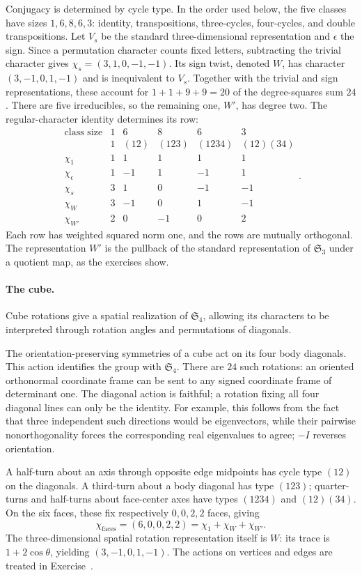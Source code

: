 Conjugacy is determined by cycle type. In the order used below, the
five classes have sizes $1,6,8,6,3$: identity, transpositions, three-cycles,
four-cycles, and double transpositions. Let $V_s$ be the standard
three-dimensional representation and $\epsilon$ the sign. Since a
permutation character counts fixed letters, subtracting the trivial
character gives
$\chi_s=(3,1,0,-1,-1)$. Its sign twist, denoted $W$, has character
$(3,-1,0,1,-1)$ and is inequivalent to $V_s$.
Together with the trivial and sign representations, these account for
$1+1+9+9=20$ of the degree-squares sum $24$. There are five irreducibles,
so the remaining one, $W'$, has degree two. The regular-character identity
determines its row:
\[
 \begin{array}{c|rrrrr}
 \text{class size}&1&6&8&6&3\\
 &1&(12)&(123)&(1234)&(12)(34)\\\hline
 \chi_1&1&1&1&1&1\\
 \chi_\epsilon&1&-1&1&-1&1\\
 \chi_s&3&1&0&-1&-1\\
 \chi_W&3&-1&0&1&-1\\
 \chi_{W'}&2&0&-1&0&2
 \end{array}.
\]
Each row has weighted squared norm one, and the rows are mutually orthogonal.
The representation $W'$ is the pullback of the standard representation
of $\mathfrak S_3$ under a quotient map, as the exercises show.

\paragraph{The cube.}

Cube rotations give a spatial realization of $\mathfrak S_4$, allowing its
characters to be interpreted through rotation angles and permutations of
diagonals.

The orientation-preserving symmetries of a cube act on its four body
diagonals. This action identifies the group with $\mathfrak S_4$.
There are $24$ such rotations: an oriented orthonormal coordinate frame
can be sent to any signed coordinate frame of determinant one. The diagonal
action is faithful; a rotation fixing all four diagonal lines can only be
the identity. For example, this follows from the fact that three independent
such directions would be eigenvectors, while their pairwise nonorthogonality
forces the corresponding real eigenvalues to agree; $-I$ reverses orientation.

A half-turn about an axis through opposite edge midpoints has cycle type
$(12)$ on the diagonals. A third-turn about a body diagonal has type
$(123)$; quarter-turns and half-turns about face-center axes have types
$(1234)$ and $(12)(34)$. On the six faces, these fix respectively
$0,0,2,2$ faces, giving
\[
 \chi_{\mathrm{faces}}=(6,0,0,2,2)=\chi_1+\chi_W+\chi_{W'}.
\]
The three-dimensional spatial rotation representation itself is $W$:
its trace is $1+2\cos\theta$, yielding $(3,-1,0,1,-1)$.
The actions on vertices and edges are treated in
Exercise~.

